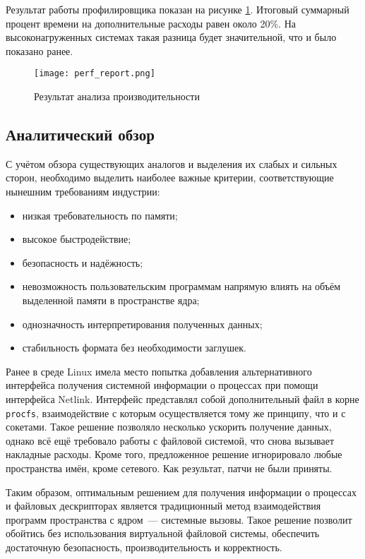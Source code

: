 Результат работы профилировщика показан на рисунке \ref{fig:perf_report}.
Итоговый суммарный процент времени на дополнительные расходы равен около 20\%.
На высоконагруженных системах такая разница будет значительной, что и было
показано ранее.

\begin{figure}
  \centering
  \texttt{[image: perf\_report.png]}
  \caption{Результат анализа производительности}
  \label{fig:perf_report}
\end{figure}

\subsection{Аналитический обзор}
\label{sub:domain:analitic_overview}

С учётом обзора существующих аналогов и выделения их слабых и сильных сторон,
необходимо выделить наиболее важные критерии, соответствующие нынешним
требованиям индустрии:

\begin{itemize}
\item низкая требовательность по памяти;
\item высокое быстродействие;
\item безопасность и надёжность;
\item невозможность пользовательским программам напрямую влиять на объём
  выделенной памяти в пространстве ядра;
\item однозначность интерпретирования полученных данных;
\item стабильность формата без необходимости заглушек.
\end{itemize}

Ранее в среде Linux имела место попытка добавления альтернативного интерфейса
получения системной информации о процессах при помощи интерфейса
Netlink\cite{vagin}. Интерфейс представлял собой дополнительный файл в корне
\texttt{procfs}, взаимодействие с которым осуществляется тому же принципу, что и
с сокетами. Такое решение позволяло несколько ускорить получение данных, однако
всё ещё требовало работы с файловой системой, что снова вызывает накладные
расходы. Кроме того, предложенное решение игнорировало любые пространства имён,
кроме сетевого. Как результат, патчи не были приняты.

Таким образом, оптимальным решением для получения информации о процессах и
файловых дескрипторах является традиционный метод взаимодействия программ
пространства с ядром~--- системные вызовы\cite{man_syscall}. Такое решение
позволит обойтись без использования виртуальной файловой системы, обеспечить
достаточную безопасность, производительность и корректность.

\nocite{tanenbaum, lkml}
